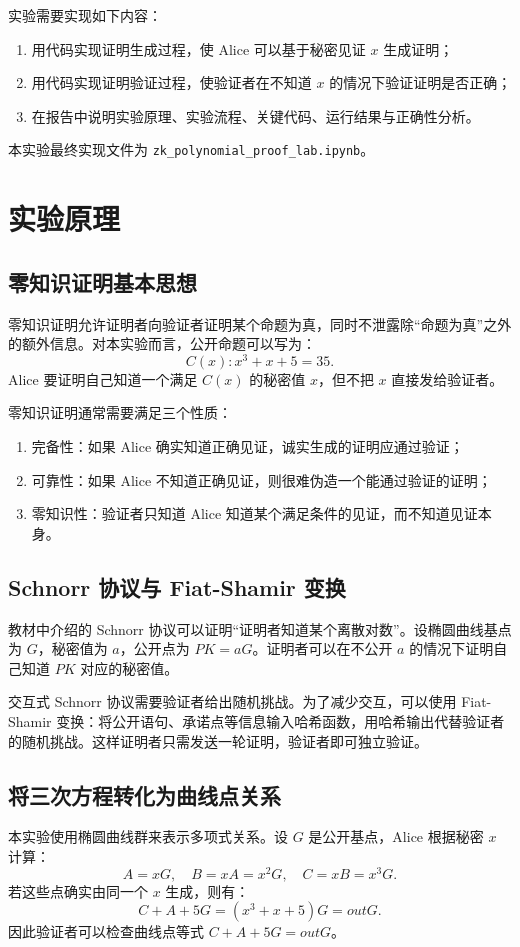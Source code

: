 \documentclass[a4paper]{article}
\begin{document}
	实验需要实现如下内容：
	\begin{enumerate}
		\item 用代码实现证明生成过程，使 Alice 可以基于秘密见证 \(x\) 生成证明；
		\item 用代码实现证明验证过程，使验证者在不知道 \(x\) 的情况下验证证明是否正确；
		\item 在报告中说明实验原理、实验流程、关键代码、运行结果与正确性分析。
	\end{enumerate}
	
	本实验最终实现文件为 \texttt{zk\_polynomial\_proof\_lab.ipynb}。
	
	\section{实验原理}
	\subsection{零知识证明基本思想}
	零知识证明允许证明者向验证者证明某个命题为真，同时不泄露除“命题为真”之外的额外信息。对本实验而言，公开命题可以写为：
	\[
		C(x): x^{3}+x+5=35.
	\]
	Alice 要证明自己知道一个满足 \(C(x)\) 的秘密值 \(x\)，但不把 \(x\) 直接发给验证者。
	
	零知识证明通常需要满足三个性质：
	\begin{enumerate}
		\item 完备性：如果 Alice 确实知道正确见证，诚实生成的证明应通过验证；
		\item 可靠性：如果 Alice 不知道正确见证，则很难伪造一个能通过验证的证明；
		\item 零知识性：验证者只知道 Alice 知道某个满足条件的见证，而不知道见证本身。
	\end{enumerate}
	
	\subsection{Schnorr 协议与 Fiat-Shamir 变换}
	教材中介绍的 Schnorr 协议可以证明“证明者知道某个离散对数”。设椭圆曲线基点为 \(G\)，秘密值为 \(a\)，公开点为 \(PK=aG\)。证明者可以在不公开 \(a\) 的情况下证明自己知道 \(PK\) 对应的秘密值。
	
	交互式 Schnorr 协议需要验证者给出随机挑战。为了减少交互，可以使用 Fiat-Shamir 变换：将公开语句、承诺点等信息输入哈希函数，用哈希输出代替验证者的随机挑战。这样证明者只需发送一轮证明，验证者即可独立验证。
	
	\subsection{将三次方程转化为曲线点关系}
	本实验使用椭圆曲线群来表示多项式关系。设 \(G\) 是公开基点，Alice 根据秘密 \(x\) 计算：
	\[
		A=xG,\quad B=xA=x^{2}G,\quad C=xB=x^{3}G.
	\]
	若这些点确实由同一个 \(x\) 生成，则有：
	\[
		C+A+5G=(x^{3}+x+5)G=outG.
	\]
	因此验证者可以检查曲线点等式 \(C+A+5G=outG\)。
	
\end{document}

